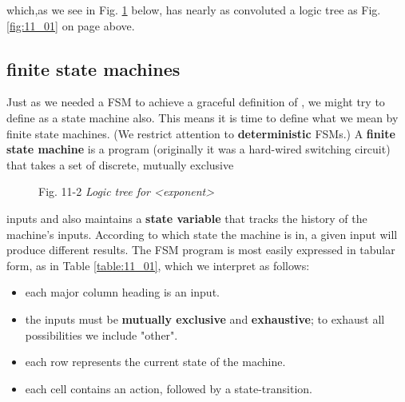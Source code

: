 which,as we see in Fig. \ref{fig:11_02} below, has nearly as convoluted a logic tree as Fig. \ref{fig:11_01} on page \pageref{fig:11_01} above.

\subsection{finite state machines}\label{chap:11_02_02}

Just as we needed a FSM to achieve a graceful definition of , we might try to define  as a state machine also. This means it is time to define what we mean by finite state machines. (We restrict attention to \textbf{deterministic} FSMs.) A \textbf{finite state machine} is a program (originally it was a hard-wired switching circuit) that takes a set of discrete, mutually exclusive

\begin{figure}
    \caption{Fig. 11-2 \textit{Logic tree for <exponent>}}
    \label{fig:11_02}
\end{figure}

inputs and also maintains a \textbf{state variable} that tracks the history of the machine's inputs. According to which state the machine is in, a given input will produce different results. The FSM program is most easily expressed in tabular form, as in Table \ref{table:11_01}, which we interpret as follows:

\begin{itemize}
    \item each major column heading is an input.
    \item the inputs must be \textbf{mutually exclusive} and \textbf{exhaustive}; to exhaust all possibilities we include "other".
    \item each row represents the current state of the machine.
    \item each cell contains an action, followed by a state-transition.
\end{itemize}


